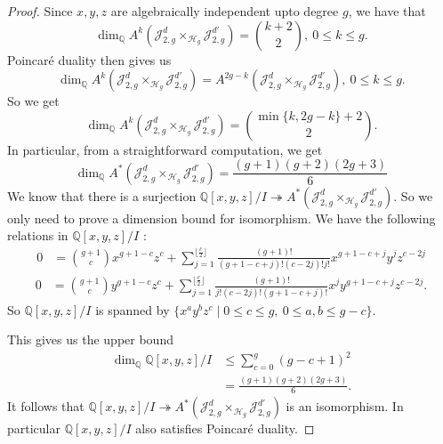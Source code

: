 \documentclass[11pt]{amsart}
\theoremstyle{definition}
\begin{document}
\begin{proof}
Since $x,y, z$ are algebraically independent upto degree $g$, we have that \begin{equation*}
    \dim_{\mathbb Q} A^k (\mathcal J^d_{2,g} \times_{\mathcal H_g} \mathcal J^{d'}_{2,g}) = \binom{k+2}{2}, \ 0\leq k\leq g.
\end{equation*}Poincar\'e duality then gives us \begin{equation*}
    \dim_{\mathbb Q}A^k (\mathcal J^d_{2,g} \times_{\mathcal H_g} \mathcal J^{d'}_{2,g})= A^{2g-k} (\mathcal J^d_{2,g} \times_{\mathcal H_g} \mathcal J^{d'}_{2,g}) , \ 0\leq k\leq g. 
\end{equation*}So we get \begin{equation*}
    \dim_{\mathbb Q} A^k (\mathcal J^d_{2,g} \times_{\mathcal H_g} \mathcal J^{d'}_{2,g}) = \binom{\min{\{k,2g-k\}+2}}{2}. 
\end{equation*}
In particular, from a straightforward computation, we get $$\dim_{\mathbb Q}A^*(\mathcal J^d_{2,g} \times_{\mathcal H_g} \mathcal J^{d'}_{2,g}) = \frac{(g+1)(g+2)(2g+3)}{6}$$
We know that there is a surjection $\mathbb Q[x,y,z]/I \twoheadrightarrow A^* (\mathcal J^d_{2,g} \times_{\mathcal H_g} \mathcal J^{d'}_{2,g})$. So we only need to prove a dimension bound for isomorphism. We have the following relations in $\mathbb Q[x,y,z]/I$ : \begin{equation}\label{AI assist} \begin{aligned}
    0&= \binom{g+1}{c} x^{g+1-c}z^c  +\sum_{j=1}^{\lfloor \frac{c}{2} \rfloor} \frac{(g+1)!}{(g+1-c+j)!(c-2j)! j!} x^{g+1-c+j}y^j z^{c-2j} \end{aligned} \end{equation} \begin{equation*} \begin{aligned}0& = \binom{g+1}{c} y^{g+1-c}z^c +\sum_{j=1}^{\lfloor \frac{c}{2} \rfloor} \frac{(g+1)!}{j!(c-2j)!(g+1-c+j)!} x^j y^{g+1-c+j}z^{c-2j}.
    \end{aligned}
\end{equation*} So $\mathbb Q[x,y,z]/I $ is spanned by $\{x^ay^bz^c\mid 0\leq c\leq g , \  0\leq a,b\leq g- c  \}$. 

\noindent This gives us the upper bound \begin{equation*}
     \begin{aligned}
         \dim_{\mathbb Q} \mathbb Q[x,y,z]/I & \leq \sum_{c=0}^g (g-c+1)^2 \\ & =  \frac{(g+1)(g+2)(2g+3)}{6}.
     \end{aligned}
 \end{equation*}It follows that $\mathbb Q[x,y,z]/I \twoheadrightarrow A^*(\mathcal J^d_{2,g} \times_{\mathcal H_g} \mathcal J^{d'}_{2,g})$ is an isomorphism. In particular $\mathbb Q[x,y,z]/I$ also satisfies Poincar\'e duality. 
\end{proof}
\end{document}
